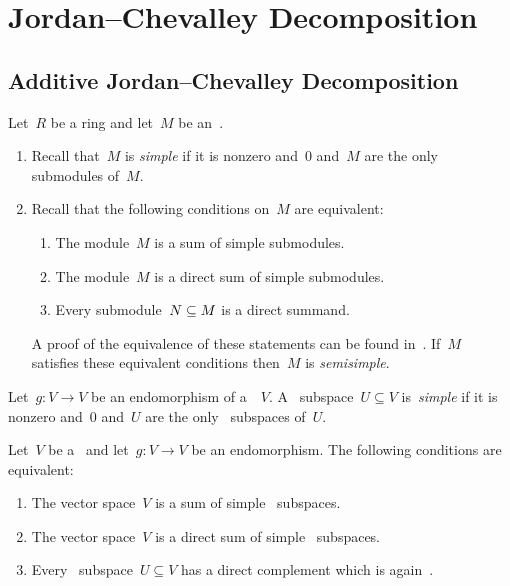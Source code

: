 \section{Jordan--Chevalley Decomposition}





\subsection{Additive Jordan--Chevalley Decomposition}



\begin{recall}
  Let~$R$ be a ring and let~$M$ be an~.
  \begin{enumerate}
    \item
      Recall that~$M$ is \emph{simple} if it is nonzero and~$0$ and~$M$ are the only submodules of~$M$.
    \item
      Recall that the following conditions on~$M$ are equivalent:
      \begin{enumerate}
        \item
          The module~$M$ is a sum of simple submodules.
        \item
          The module~$M$ is a direct sum of simple submodules.
        \item
          Every submodule~$N \subseteq M$ is a direct summand.
      \end{enumerate}
      A proof of the equivalence of these statements can be found in~\cite[Proposition~22.13]{algebra1notes}.
      If~$M$ satisfies these equivalent conditions then~$M$ is \emph{semisimple}.
  \end{enumerate}
\end{recall}


\begin{definition}
  Let~$g \colon V \to V$ be an endomorphism of a~~$V$.
  A~ subspace~$U \subseteq V$ is~\emph{simple} if it is nonzero and~$0$ and~$U$ are the only~ subspaces of~$U$.
\end{definition}


\begin{corollary}
  \label{characterizations of semisimple endomorphisms}
  Let~$V$ be a~ and let~$g \colon V \to V$ be an endomorphism.
  The following conditions are equivalent:
  \begin{enumerate}
    \item
      The vector space~$V$ is a sum of simple~ subspaces.
    \item
      The vector space~$V$ is a direct sum of simple~ subspaces.
    \item
      Every~ subspace~$U \subseteq V$ has a direct complement which is again~.
  \end{enumerate}
\end{corollary}


